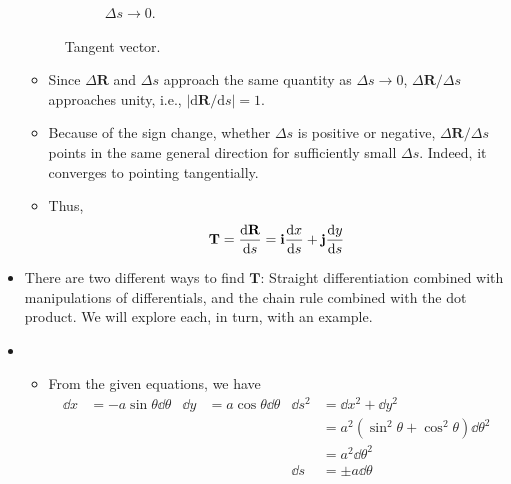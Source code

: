 \documentclass[../main.tex]{subfiles}
\begin{document}
\begin{itemize}
\begin{figure}[h!]
\begin{subfigure}[b]{0.33\linewidth}
            \caption{$\Delta s\to 0$.}
            \label{fig:tangentVectorc}
        \end{subfigure}
        \caption{Tangent vector.}
        \label{fig:tangentVector}
    \end{figure}
    \begin{itemize}
        \item Since $\Delta\textbf{R}$ and $\Delta s$ approach the same quantity as $\Delta s\to 0$, $\Delta\textbf{R}/\Delta s$ approaches unity, i.e., $|\text{d}\textbf{R}/\text{d}s|=1$.
        \item Because of the sign change, whether $\Delta s$ is positive or negative, $\Delta\textbf{R}/\Delta s$ points in the same general direction for sufficiently small $\Delta s$. Indeed, it converges to pointing tangentially.
        \item Thus,
        \begin{equation*}
            \textbf{T} = \dv{\textbf{R}}{s} = \textbf{i}\dv{x}{s}+\textbf{j}\dv{y}{s}
        \end{equation*}
    \end{itemize}
    \item There are two different ways to find $\textbf{T}$: Straight differentiation combined with manipulations of differentials, and the chain rule combined with the dot product. We will explore each, in turn, with an example.
    \item {}
    \begin{itemize}
        \item From the given equations, we have
        \begin{align*}
            \dd{x} &= -a\sin\theta\dd{\theta}&
                \dd{y} &= a\cos\theta\dd{\theta}&
                    \dd{s}^2 &= \dd{x}^2+\dd{y}^2\\
            &&
                &&
                    &= a^2(\sin^2\theta+\cos^2\theta)\dd{\theta}^2\\
            &&
                &&
                    &= a^2\dd{\theta}^2\\
            &&
                &&
                    \dd{s} &= \pm a\dd{\theta}
        \end{align*}
        \begin{itemize}

\end{itemize}
\end{itemize}
\end{itemize}
\end{document}
